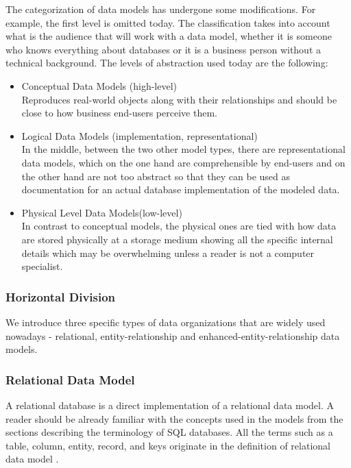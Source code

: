 The categorization of data models has undergone some modifications.  For example, the first level is omitted today. The classification takes into account what is the audience that will work with a data model, whether it is someone who knows everything about databases or it is a business person without a technical background. The levels of abstraction used today\cite{SilberschatzKorthSudarshan10} are the following: 
\begin{itemize}
	\item Conceptual Data Models (high-level) \\
	Reproduces real-world objects along with their relationships and should be close to how business end-users perceive them.
	
	\item Logical Data Models (implementation, representational) \\
	In the middle, between the two other model types, there are representational data models, which on the one hand are comprehensible by end-users and on the other hand are not too abstract so that they can be used as documentation for an actual database implementation of the modeled data.
	
	\item Physical Level Data Models(low-level) \\
	In contrast to conceptual models, the physical ones are tied with how data are stored physically at a storage medium showing all the specific internal details which may be overwhelming unless a reader is not a computer specialist.
\end{itemize}

\subsubsection{Horizontal Division}

We introduce three specific types of data organizations that are widely used nowadays - relational, entity-relationship and enhanced-entity-relationship data models.

\subsubsection{Relational Data Model}

A relational database is a direct implementation of a relational data model. A reader should be already familiar with the concepts used in the models from the sections describing the terminology of SQL databases. All the terms such as a table, column, entity, record, and keys originate in the definition of relational data model \cite{Codd69}.

